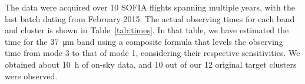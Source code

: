
The data were acquired over 10 SOFIA flights spanning multiple years, with the last batch dating from February 2015. The actual observing times for each band and cluster is shown in Table~\ref{tab:times}. In that table, we have estimated the time for the \SI{37}{\um} band using a composite formula that levels the observing time from mode 3 to that of mode 1, considering their respective sensitivities. We obtained about \SI{10}{\hour} of on-sky data, and 10 out of our 12 original target clusters were observed.

